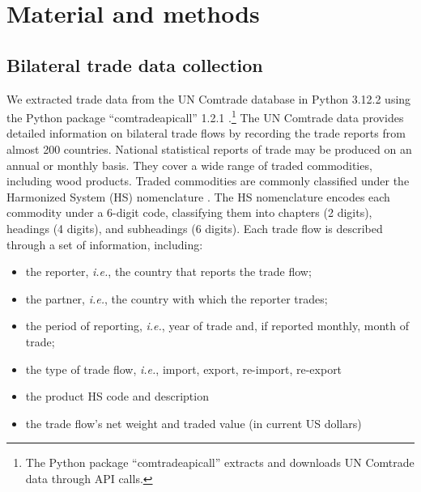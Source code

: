 \documentclass[
  authoryear,
  review,
  3p]{elsarticle}
\providecommand{\tightlist}{%
  \setlength{\itemsep}{0pt}\setlength{\parskip}{0pt}}
\begin{document}
\section{Material and methods}\label{material-and-methods}

\subsection{Bilateral trade data
collection}\label{bilateral-trade-data-collection}

We extracted trade data from the UN Comtrade database in Python 3.12.2
using the Python package ``comtradeapicall'' 1.2.1
\citep{2024comtradeapicall}.\footnote{The Python package
  ``comtradeapicall'' extracts and downloads UN Comtrade data through
  API calls.} The UN Comtrade data provides detailed information on
bilateral trade flows by recording the trade reports from almost 200
countries. National statistical reports of trade may be produced on an
annual or monthly basis. They cover a wide range of traded commodities,
including wood products. Traded commodities are commonly classified
under the Harmonized System (HS) nomenclature \citep{1983hs}. The HS
nomenclature encodes each commodity under a 6-digit code, classifying
them into chapters (2 digits), headings (4 digits), and subheadings (6
digits). Each trade flow is described through a set of information,
including:

\begin{itemize}
\tightlist
\item
  the reporter, \emph{i.e.}, the country that reports the trade flow;
\item
  the partner, \emph{i.e.}, the country with which the reporter trades;
\item
  the period of reporting, \emph{i.e.}, year of trade and, if reported
  monthly, month of trade;
\item
  the type of trade flow, \emph{i.e.}, import, export, re-import,
  re-export
\item
  the product HS code and description
\item
  the trade flow's net weight and traded value (in current US dollars)
\end{itemize}
\end{document}
